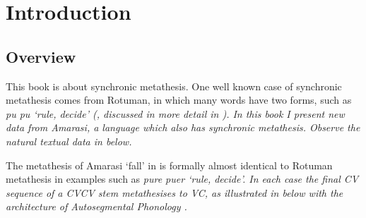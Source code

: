 \chapter{Introduction}

\section{Overview}
This book is about synchronic metathesis.
One well known case of synchronic metathesis comes
from Rotuman, in which many words have two forms,
such as \it{pu} {\tl} \it{pu} `rule, decide'
(\citealp[14]{ch40}, discussed in more detail in ).
In this book I present new data from Amarasi,
a language which also has synchronic metathesis.
Observe the natural textual data in  below.

\begin{exe}
	\label{ex:130902-1, 1.43 ch:Intr}
	\begin{xlist}
	\end{xlist}
\end{exe}

The metathesis of Amarasi  {\tl}  `fall'
in  is formally almost identical to Rotuman
metathesis in examples such as \it{pure} {\tl} \it{puer} `rule, decide'.
In each case the final CV sequence of a CVCV stem metathesises to VC,
as illustrated in  below with
the architecture of Autosegmental Phonology \citep{go76}.

